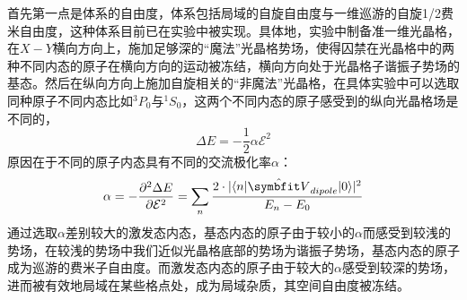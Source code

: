 首先第一点是体系的自由度，体系包括局域的自旋自由度与一维巡游的自旋1/2费米自由度，这种体系目前已在实验中被实现\cite{riegger2018localized}。具体地，实验中制备准一维光晶格，在$X-Y$横向方向上，施加足够深的“魔法”光晶格势场，使得囚禁在光晶格中的两种不同内态的原子在横向方向的运动被冻结，横向方向处于光晶格子谐振子势场的基态。然后在纵向方向上施加自旋相关的“非魔法”光晶格，在具体实验中可以选取同种原子不同内态比如${}^3P_0$与${}^1S_0$，这两个不同内态的原子感受到的纵向光晶格场是不同的，
\begin{equation}
    \Delta E = -\frac{1}{2}\alpha\mathcal{E}^2
\end{equation}
原因在于不同的原子内态具有不同的交流极化率$\alpha$：
\begin{equation}
\alpha = -\frac{\partial^2\Delta E}{\partial \mathcal{E}^2} = \sum_{n} \frac{2\cdot|\langle n|\hat{\Vector{V}}_{dipole}|0\rangle|^2}{E_n-E_0}
\end{equation}
通过选取$\alpha$差别较大的激发态内态，基态内态的原子由于较小的$\alpha$而感受到较浅的势场，在较浅的势场中我们近似光晶格底部的势场为谐振子势场，基态内态的原子成为巡游的费米子自由度。而激发态内态的原子由于较大的$\alpha$感受到较深的势场，进而被有效地局域在某些格点处，成为局域杂质，其空间自由度被冻结。

